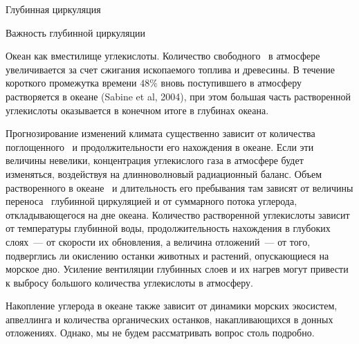 \begin{chapter}{Глубинная циркуляция}
\begin{section}{Важность глубинной циркуляции}
\begin{paragraph}{Океан как вместилище углекислоты.}
Количество свободного~\COtwo{} в атмосфере увеличивается за счет
сжигания ископаемого топлива и древесины. В течение короткого промежутка
времени $48\%$ вновь поступившего в атмосферу~\COtwo{} растворяется в 
океане (Sabine et al, 2004), при этом большая часть растворенной углекислоты
оказывается в конечном итоге в глубинах океана.
%

Прогнозирование изменений климата существенно зависит от количества
поглощенного~\COtwo{} и продолжительности его нахождения в океане. Если эти
величины невелики, концентрация углекислого газа в атмосфере будет изменяться, 
воздействуя на длинноволновый радиационный баланс. Объем растворенного в 
океане~\COtwo{} и длительность его пребывания там зависят от величины
переноса~\COtwo{} глубинной циркуляцией и от
суммарного потока углерода, откладывающегося на дне океана. 
Количество растворенной углекислоты зависит от температуры глубинной воды,
продолжительность нахождения в глубоких слоях~--- от скорости их обновления,
а величина отложений~--- от того, подверглись ли окислению останки животных 
и растений, опускающиеся на морское дно. Усиление вентиляции глубинных слоев 
и их нагрев могут привести к выбросу большого количества углекислоты 
в атмосферу.
%

Накопление углерода в океане также зависит от динамики морских экосистем,
апвеллинга и количества органических 
останков, накапливающихся в донных отложениях. Однако, мы не будем 
рассматривать вопрос столь подробно.
%
\end{paragraph}


\end{section}
\end{chapter}
